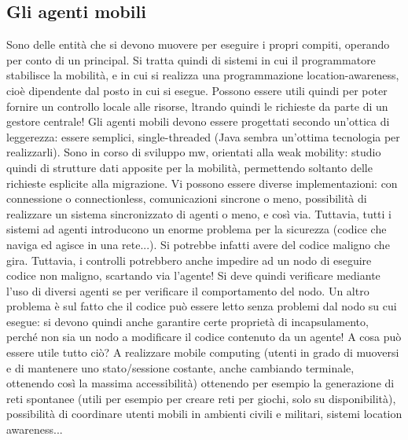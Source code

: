 \subsection{Gli agenti mobili}
Sono delle entità che si devono muovere per eseguire i propri compiti, operando per conto di un principal. Si tratta 
quindi di sistemi in cui il programmatore stabilisce la mobilità, e in cui si realizza una programmazione 
location-awareness, cioè dipendente dal posto in cui si esegue. Possono essere utili quindi per poter fornire un 
controllo locale alle risorse, ltrando quindi le richieste da parte di un gestore centrale! Gli agenti mobili devono 
essere progettati secondo un'ottica di leggerezza: essere semplici, single-threaded (Java sembra un'ottima tecnologia
per realizzarli). Sono in corso di sviluppo mw, orientati alla weak mobility:
studio quindi di strutture dati apposite per la mobilità, permettendo soltanto delle richieste esplicite alla 
migrazione. 
Vi possono essere diverse implementazioni: con connessione o connectionless, comunicazioni sincrone o meno, possibilità 
di realizzare un sistema sincronizzato di agenti o meno, e così via. Tuttavia, tutti i sistemi ad agenti introducono un
enorme problema per la sicurezza (codice che naviga ed agisce in una rete...). Si potrebbe infatti avere del codice 
maligno che gira. Tuttavia, i controlli potrebbero anche impedire ad un nodo di eseguire codice non maligno, scartando
via l'agente! Si deve quindi verificare mediante l'uso di diversi agenti se per verificare il comportamento del nodo.
Un altro problema è sul fatto che il codice può essere letto senza problemi dal nodo su cui esegue: si devono quindi 
anche garantire certe proprietà di incapsulamento, perché non sia un nodo a modificare il codice contenuto da un agente!
A cosa può essere utile tutto ciò? A realizzare mobile computing (utenti in grado di muoversi e di mantenere uno 
stato/sessione costante, anche cambiando terminale, ottenendo così la massima accessibilità) ottenendo per esempio la
generazione di reti spontanee (utili per esempio per creare reti per giochi, solo su disponibilità), possibilità di 
coordinare utenti mobili in ambienti civili e militari, sistemi location awareness...